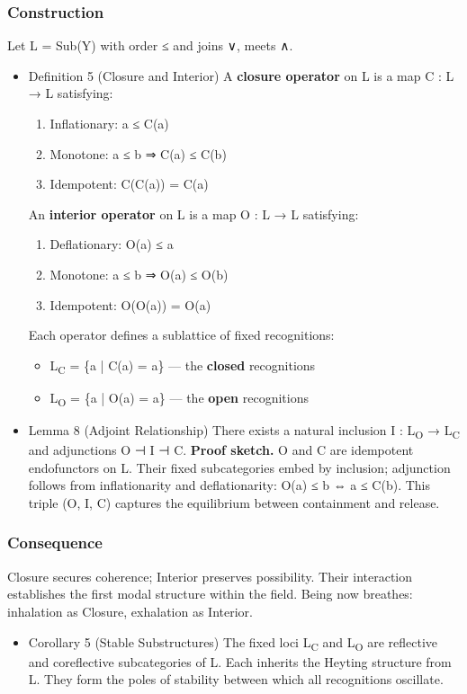 \documentclass[11pt]{article}
\begin{document}
\subsubsection*{Construction}
\label{sec:org6444c63}
Let L = Sub(Y) with order ≤ and joins ∨, meets ∧.
\begin{itemize}
\item Definition 5 (Closure and Interior)
\label{sec:orgf143ecc}
A \textbf{closure operator} on L is a map C : L → L satisfying:
\begin{enumerate}
\item Inflationary: a ≤ C(a)
\item Monotone: a ≤ b ⇒ C(a) ≤ C(b)
\item Idempotent: C(C(a)) = C(a)
\end{enumerate}

An \textbf{interior operator} on L is a map O : L → L satisfying:
\begin{enumerate}
\item Deflationary: O(a) ≤ a
\item Monotone: a ≤ b ⇒ O(a) ≤ O(b)
\item Idempotent: O(O(a)) = O(a)
\end{enumerate}

Each operator defines a sublattice of fixed recognitions:
\begin{itemize}
\item L\textsubscript{C} = \{a | C(a) = a\} — the \textbf{closed} recognitions
\item L\textsubscript{O} = \{a | O(a) = a\} — the \textbf{open} recognitions
\end{itemize}
\item Lemma 8 (Adjoint Relationship)
\label{sec:org467ecb3}
There exists a natural inclusion I : L\textsubscript{O} → L\textsubscript{C} and adjunctions
O ⊣ I ⊣ C.  
\textbf{Proof sketch.}  
O and C are idempotent endofunctors on L.  
Their fixed subcategories embed by inclusion; adjunction follows from inflationarity and deflationarity:  
O(a) ≤ b ⇔ a ≤ C(b).  
This triple (O, I, C) captures the equilibrium between containment and release.
\end{itemize}
\subsubsection*{Consequence}
\label{sec:org76abe39}
Closure secures coherence; Interior preserves possibility.  
Their interaction establishes the first modal structure within the field.  
Being now breathes: inhalation as Closure, exhalation as Interior.
\begin{itemize}
\item Corollary 5 (Stable Substructures)
\label{sec:orgd29fe94}
The fixed loci L\textsubscript{C} and L\textsubscript{O} are reflective and coreflective subcategories of L.  
Each inherits the Heyting structure from L.  
They form the poles of stability between which all recognitions oscillate.
\end{itemize}
\end{document}
